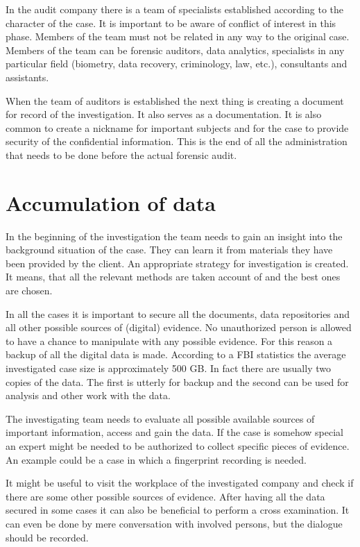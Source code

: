 In the audit company there is a team of specialists established according to the character of the case. It is important to be aware of conflict of interest in this phase. Members of the team must not be related in any way to the original case. Members of the team can be forensic auditors, data analytics, specialists in any particular field (biometry, data recovery, criminology, law, etc.), consultants and assistants. 

When the team of auditors is established the next thing is creating a document for record of the investigation. It also serves as a documentation. It is also common to create a nickname for important subjects and for the case to provide security of the confidential information. This is the end of all the administration that needs to be done before the actual forensic audit. 

\section{Accumulation of data}
In the beginning of the investigation the team needs to gain an insight into the background situation of the case. They can learn it from materials they have been provided by the client. An appropriate strategy for investigation is created. It means, that all the relevant methods are taken account of and the best ones are chosen. 

In all the cases it is important to secure all the documents, data repositories and all other possible sources of (digital) evidence. No unauthorized person is allowed to have a chance to manipulate with any possible evidence. For this reason a backup of all the digital data is made. According to a FBI statistics the average investigated case size is approximately 500 GB.  In fact there are usually two copies of the data. The first is utterly for backup and the second can be used for analysis and other work with the data. 

The investigating team needs to evaluate all possible available sources of important information, access and gain the data. If the case is somehow special an expert might be needed to be authorized to collect specific pieces of evidence. An example could be a case in which a fingerprint recording is needed. 

It might be useful to visit the workplace of the investigated company and check if there are some other possible sources of evidence. After having all the data secured in some cases it can also be beneficial to perform a cross examination. It can even be done by mere conversation with involved persons, but the dialogue should be recorded.


